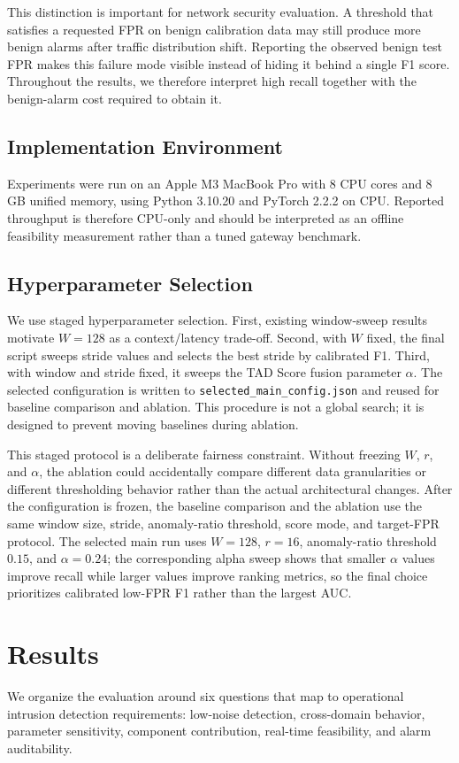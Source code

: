 \documentclass[conference]{IEEEtran}
\newcommand{\tad}{TAD Score}
\begin{document}
This distinction is important for network security evaluation. A threshold that satisfies a requested FPR on benign calibration data may still produce more benign alarms after traffic distribution shift. Reporting the observed benign test FPR makes this failure mode visible instead of hiding it behind a single F1 score. Throughout the results, we therefore interpret high recall together with the benign-alarm cost required to obtain it.

\subsection{Implementation Environment}
Experiments were run on an Apple M3 MacBook Pro with 8 CPU cores and 8 GB unified memory, using Python 3.10.20 and PyTorch 2.2.2 on CPU. Reported throughput is therefore CPU-only and should be interpreted as an offline feasibility measurement rather than a tuned gateway benchmark.

\subsection{Hyperparameter Selection}
We use staged hyperparameter selection. First, existing window-sweep results motivate $W=128$ as a context/latency trade-off. Second, with $W$ fixed, the final script sweeps stride values and selects the best stride by calibrated F1. Third, with window and stride fixed, it sweeps the \tad{} fusion parameter $\alpha$. The selected configuration is written to \texttt{selected\_main\_config.json} and reused for baseline comparison and ablation. This procedure is not a global search; it is designed to prevent moving baselines during ablation.

This staged protocol is a deliberate fairness constraint. Without freezing $W$, $r$, and $\alpha$, the ablation could accidentally compare different data granularities or different thresholding behavior rather than the actual architectural changes. After the configuration is frozen, the baseline comparison and the ablation use the same window size, stride, anomaly-ratio threshold, score mode, and target-FPR protocol. The selected main run uses $W=128$, $r=16$, anomaly-ratio threshold $0.15$, and $\alpha=0.24$; the corresponding alpha sweep shows that smaller $\alpha$ values improve recall while larger values improve ranking metrics, so the final choice prioritizes calibrated low-FPR F1 rather than the largest AUC.
\FloatBarrier

\section{Results}
We organize the evaluation around six questions that map to operational intrusion detection requirements: low-noise detection, cross-domain behavior, parameter sensitivity, component contribution, real-time feasibility, and alarm auditability.
\end{document}
